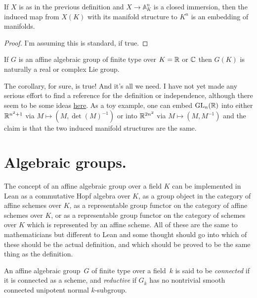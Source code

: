 \begin{theorem}\label{manifold_on_algebraic_variety_computation}\notready
    If $X$ is as in the previous definition and $X\to\mathbb{A}^n_K$ is a closed immersion, then the induced map from $X(K)$ with its manifold structure to $K^n$ is an embedding of manifolds. 
\end{theorem}
\begin{proof} I'm assuming this is standard, if true. 
\end{proof}
\begin{corollary}\label{lie_group_from_algebraic_group}\notready
    If $G$ is an affine algebraic group of finite type over $K=\mathbb{R}$ or $\mathbb{C}$ then $G(K)$ is naturally a real or complex Lie group.
\end{corollary}
\begin{remark}

    The corollary, for sure, is true! And it's all we need. I have not yet made any serious effort to find a reference for the definition or independence, although there seem to be some ideas \href{https://leanprover.zulipchat.com/#narrow/stream/116395-maths/topic/top.20space.20.2F.20manifold.20structure.20on.20points.20of.20alg.20varieties/near/431812525}{here}. As a toy example, one can embed $\operatorname{GL}_n(\mathbb{R})$ into either $\mathbb{R}^{n^2+1}$ via $M\mapsto (M,\det(M)^{-1})$ or into $\mathbb{R}^{2n^2}$ via $M\mapsto (M,M^{-1})$ and the claim is that the two induced manifold structures are the same.
\end{remark}
\section{Algebraic groups.}

The concept of an affine algebraic group over a field $K$ can be implemented in Lean as a commutative Hopf algebra over $K$, as a group object in the category of affine schemes over $K$, as a representable group functor on the category of affine schemes over $K$, or as a representable group functor on the category of schemes over $K$ which is represented by an affine scheme. All of these are the same to mathematicians but different to Lean and some thought should go into which of these should be the actual definition, and which should be proved to be the same thing as the definition.

\begin{definition}\label{connected_reductive_group}\notready An affine algebraic group~$G$ of finite type over a field~$k$ is said to be \emph{connected} if it is connected as a scheme, and \emph{reductive} if $G_{\overline{k}}$ has no nontrivial smooth connected unipotent normal $k$-subgroup.
\end{definition}


